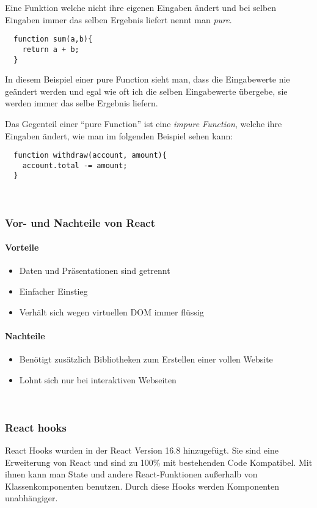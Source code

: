  Eine Funktion welche nicht ihre eigenen Eingaben ändert und bei selben Eingaben immer das selben 
 Ergebnis liefert nennt man \textit{pure}.
\begin{lstlisting}
  function sum(a,b){
    return a + b;
  }
\end{lstlisting}
In diesem Beispiel einer pure Function sieht man, dass die Eingabewerte nie geändert werden und egal 
wie oft ich die selben Eingabewerte übergebe, sie werden immer das selbe Ergebnis liefern.


Das Gegenteil einer ``pure Function'' ist eine \textit{impure Function}, welche ihre Eingaben ändert, 
wie man im folgenden Beispiel sehen kann:
\begin{lstlisting}
  function withdraw(account, amount){
    account.total -= amount;
  }
\end{lstlisting}
~\cite{Props}
\subsubsection{Vor- und Nachteile von React}
\paragraph{Vorteile}
\begin{itemize}
	\item Daten und Präsentationen sind getrennt
	\item Einfacher Einstieg
	\item Verhält sich wegen virtuellen DOM immer flüssig
\end{itemize}
\paragraph{Nachteile}
\begin{itemize}
	\item Benötigt zusätzlich Bibliotheken zum Erstellen einer vollen Website
	\item Lohnt sich nur bei interaktiven Webseiten
\end{itemize}~\cite{ReactVor-undNachteile}

\subsubsection{React hooks}
React Hooks wurden in der React Version 16.8 hinzugefügt. Sie sind eine Erweiterung von React und sind 
zu 100\% mit bestehenden Code Kompatibel. Mit ihnen kann man State und andere React-Funktionen außerhalb 
von Klassenkomponenten benutzen. Durch diese Hooks werden Komponenten unabhängiger. 


